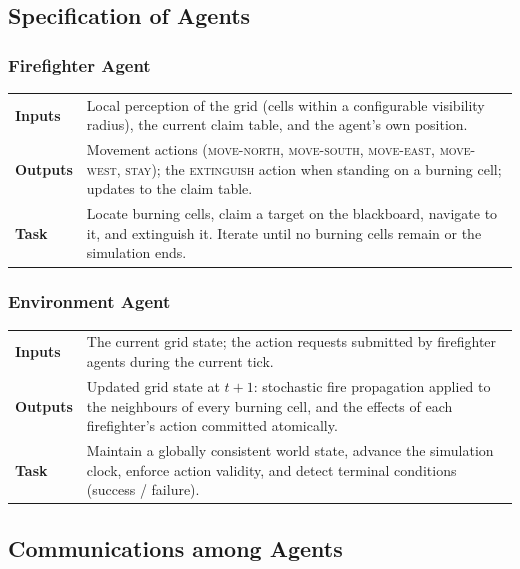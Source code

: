 \documentclass[a4paper, 11pt]{article}
\begin{document}
\subsection{Specification of Agents}

\subsubsection{Firefighter Agent}

\begin{tabular}{p{3cm}p{10.5cm}}
\toprule
\textbf{Inputs}   & Local perception of the grid (cells within a configurable visibility radius), the current claim table, and the agent's own position. \\
\textbf{Outputs}  & Movement actions (\textsc{move-north}, \textsc{move-south}, \textsc{move-east}, \textsc{move-west}, \textsc{stay}); the \textsc{extinguish} action when standing on a burning cell; updates to the claim table. \\
\textbf{Task}     & Locate burning cells, claim a target on the blackboard, navigate to it, and extinguish it. Iterate until no burning cells remain or the simulation ends. \\
\bottomrule
\end{tabular}

\subsubsection{Environment Agent}

\begin{tabular}{p{3cm}p{10.5cm}}
\toprule
\textbf{Inputs}   & The current grid state; the action requests submitted by firefighter agents during the current tick. \\
\textbf{Outputs}  & Updated grid state at $t+1$: stochastic fire propagation applied to the neighbours of every burning cell, and the effects of each firefighter's action committed atomically. \\
\textbf{Task}     & Maintain a globally consistent world state, advance the simulation clock, enforce action validity, and detect terminal conditions (success / failure). \\
\bottomrule
\end{tabular}

\subsection{Communications among Agents}
\end{document}
